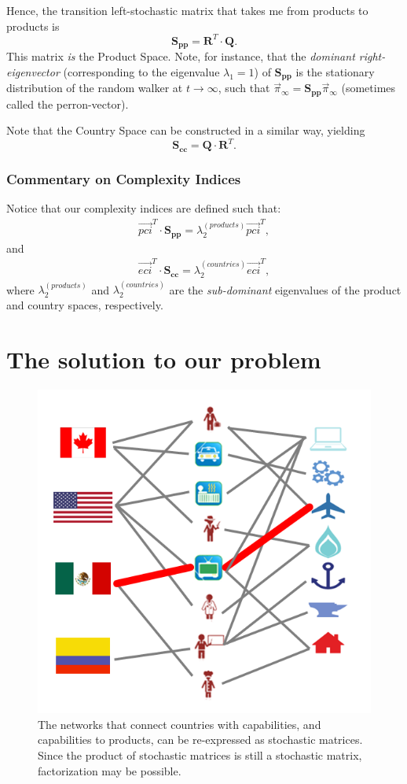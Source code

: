 \documentclass[12pt]{article}
\newcommand{\mtx}[1]{\mathbf{ #1}}
\begin{document}
Hence, the transition left-stochastic matrix that takes me from products to products is
$$
	\mtx{S_{pp}} = \mtx{R}^T\cdot\mtx{Q}.
$$
This matrix \emph{is} the Product Space. Note, for instance, that the \emph{dominant right-eigenvector} (corresponding to the eigenvalue $\lambda_1=1$) of $\mtx{S_{pp}}$ is the stationary distribution of the random walker at $t\rightarrow\infty$, such that $\vec{\pi}_{\infty}=\mtx{S_{pp}}\vec{\pi}_{\infty}$ (sometimes called the perron-vector).

Note that the Country Space can be constructed in a similar way, yielding
$$
	\mtx{S_{cc}} = \mtx{Q}\cdot\mtx{R}^T.
$$

\subsubsection{Commentary on Complexity Indices}
Notice that our complexity indices are defined such that:
\begin{align}
	\vec{pci}^T\cdot \mtx{S_{pp}} = \lambda^{(products)}_2\vec{pci}^T , 
\end{align}
and
\begin{align}
	\vec{eci}^T\cdot \mtx{S_{cc}} = \lambda^{(countries)}_2\vec{eci}^T,
\end{align}
where $\lambda^{(products)}_2$ and $\lambda^{(countries)}_2$ are the \emph{sub-dominant} eigenvalues of the product and country spaces, respectively.

\section{The solution to our problem}
\begin{figure}[!ht]
		\centering
			\includegraphics[width=0.5\linewidth]{CAP.png}
		\caption{The networks that connect countries with capabilities, and capabilities to products, can be re-expressed as stochastic matrices. Since the product of stochastic matrices is still a stochastic matrix, factorization may be possible.
		}
\label{fig:cap}
\end{figure}
\end{document}
